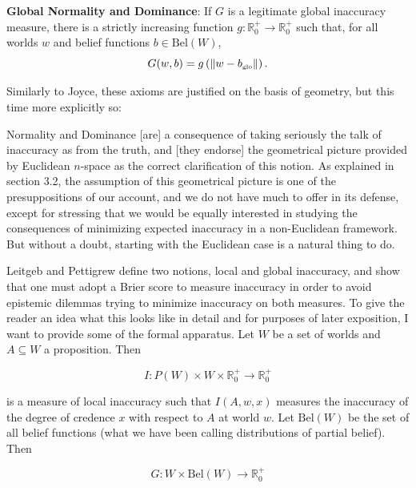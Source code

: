 \documentclass[phd,12pt,oneside]{ubcthesis}
\begin{document}
\begin{quotex}
  \textbf{Global Normality and Dominance}: If $G$ is a legitimate
  global inaccuracy measure, there is a strictly increasing function
  $g:\mathbb{R}^{+}_{0}\rightarrow\mathbb{R}^{+}_{0}$ such that, for
  all worlds $w$ and belief functions $b\in{}\mbox{Bel}(W)$,
  \begin{equation}
    \label{eq:e5}
  G(w,b)=g\left(\|w-b_{\mbox{{\tiny glo}}}\|\right).
  \end{equation}
\end{quotex}

Similarly to Joyce, these axioms are justified on the basis of
geometry, but this time more explicitly so:

\begin{quotex}
  Normality and Dominance [are] a consequence of taking seriously the
  talk of inaccuracy as  from the truth, and [they
  endorse] the geometrical picture provided by Euclidean $n$-space as
  the correct clarification of this notion. As explained in section
  3.2, the assumption of this geometrical picture is one of the
  presuppositions of our account, and we do not have much to offer in
  its defense, except for stressing that we would be equally
  interested in studying the consequences of minimizing expected
  inaccuracy in a non-Euclidean framework. But without a doubt,
  starting with the Euclidean case is a natural thing to do.
\end{quotex}

Leitgeb and Pettigrew define two notions, local and global inaccuracy,
and show that one must adopt a Brier score to measure inaccuracy in
order to avoid epistemic dilemmas trying to minimize inaccuracy on
both measures. To give the reader an idea what this looks like in
detail and for purposes of later exposition, I want to provide some of
the formal apparatus. Let $W$ be a set of worlds and $A\subseteq{}W$ a
proposition. Then

\begin{equation}
  \label{eq:linacc}
  I:P(W)\times{}W\times{}\mathbb{R}^{+}_{0}\rightarrow\mathbb{R}^{+}_{0}
\end{equation}

{\noindent}is a measure of local inaccuracy such that $I(A,w,x)$
measures the inaccuracy of the degree of credence $x$ with respect to
$A$ at world $w$. Let $\mbox{Bel}(W)$ be the set of all belief
functions (what we have been calling distributions of partial belief).
Then

\begin{equation}
  \label{eq:ginacc}
  G:W\times\mbox{Bel}(W)\rightarrow\mathbb{R}^{+}_{0}
\end{equation}
\end{document}
